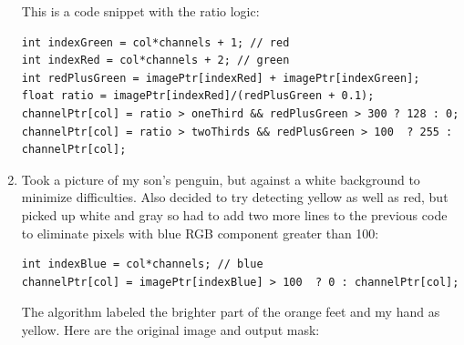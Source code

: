 \documentclass{article}
\begin{document}
\begin{enumerate}
This is a code snippet with the ratio logic:
\begin{lstlisting}
int indexGreen = col*channels + 1; // red
int indexRed = col*channels + 2; // green
int redPlusGreen = imagePtr[indexRed] + imagePtr[indexGreen]; 
float ratio = imagePtr[indexRed]/(redPlusGreen + 0.1);
channelPtr[col] = ratio > oneThird && redPlusGreen > 300 ? 128 : 0; 
channelPtr[col] = ratio > twoThirds && redPlusGreen > 100  ? 255 : channelPtr[col];
\end{lstlisting}

\item
Took a picture of my son's penguin, but against a white background to minimize difficulties. Also decided to try detecting yellow as well as red, but picked up white and gray so had to add two more lines to the previous code to eliminate pixels with blue RGB component greater than 100:
\begin{lstlisting}
int indexBlue = col*channels; // blue
channelPtr[col] = imagePtr[indexBlue] > 100  ? 0 : channelPtr[col];
\end{lstlisting}
The algorithm labeled the brighter part of the orange feet and my hand as yellow. Here are the original image and output mask:


\end{enumerate}
\end{document}
